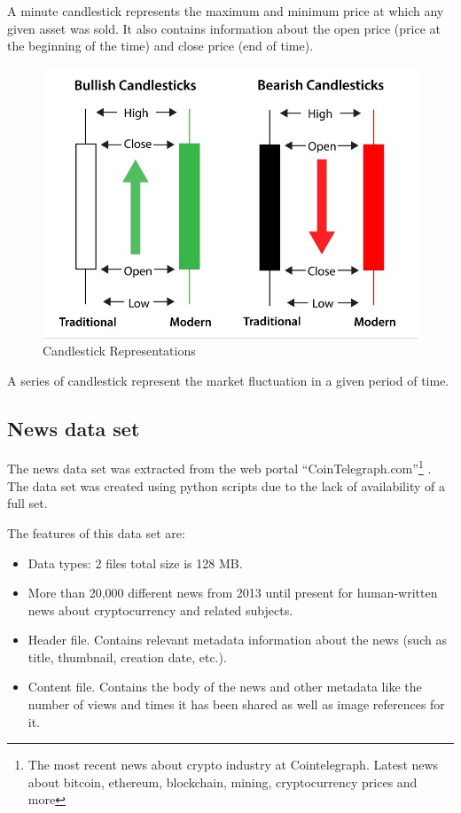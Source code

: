 A minute candlestick represents the maximum and minimum price at which any given asset was sold. It also contains information about the open price (price at the beginning of the time) and close price (end of time). 

\begin{figure}[h]
   \centering
   \includegraphics[width=\linewidth]{fig/CandlestickRepresentation.jpg}
    \caption{Candlestick Representations}
    \label{fig:CryptoCurrencyDatasetParquet}
\end{figure}

A series of candlestick represent the market fluctuation in a given period of time. 

\subsection{News data set}

The news data set was extracted from the web portal “CoinTelegraph.com”\footnote{The most recent news about crypto industry at Cointelegraph. Latest news about bitcoin, ethereum, blockchain, mining, cryptocurrency prices and more\cite{cointelegraph_cointelegraph_2013}} .
The data set was created using python scripts due to the lack of availability of a full set. 

The features of this data set are:

\begin{itemize}
    \item Data types: 2 \csv files total size is 128 MB.
    \item More than 20,000 different news from 2013 until present for human-written news about cryptocurrency and related subjects.
    \item Header file. Contains relevant metadata information about the news (such as title, thumbnail, creation date, etc.).
    \item Content file. Contains the body of the news and other metadata like the number of views and times it has been shared as well as image references for it.
\end{itemize}

